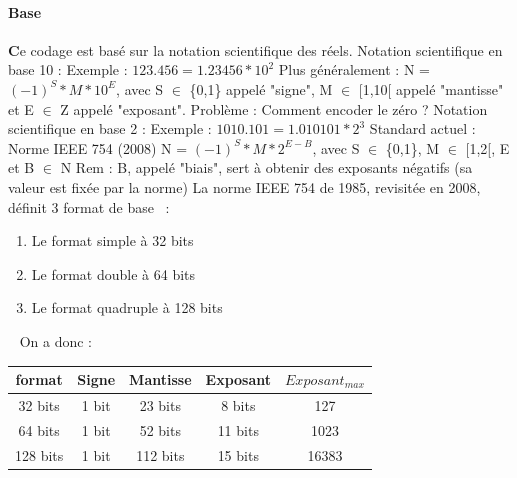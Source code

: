 \documentclass{article}
\begin{document}
\paragraph{Base}\textbf{C}e codage est bas\'e sur la notation scientifique des r\'eels.
Notation scientifique en base 10 :
Exemple : $123.456 = 1.23456 * 10^2$ 
\newline Plus g\'en\'eralement : N = $(-1)^S * M * 10^E$,  avec S $ \in $ \{0,1\} appel\'e "signe",  M $\in $ [1,10[ appel\'e "mantisse" et E $\in $ Z appel\'e "exposant".
\newline Probl\`eme : Comment encoder le z\'ero ? 
\newline Notation scientifique en base 2 :
Exemple : $1010.101 = 1.010101 * 2^3$ 
\newline Standard actuel : Norme IEEE 754 (2008) 
\newline N = $(-1)^S * M * 2^{E - B}$, avec S $\in $ \{0,1\},  M $\in $ [1,2[,  E et B $\in $ N
\newline Rem : B, appel\'e "biais", sert \`a obtenir des exposants n\'egatifs (sa valeur est fix\'ee par la norme)
\newline La norme IEEE 754 de 1985, revisit\'ee en 2008, d\'efinit 3 format de base~\cite{Norme_IEEE754} :
\begin{enumerate}
\item Le format simple \`a 32 bits
\item Le format double \`a 64 bits
\item Le format quadruple \`a 128 bits
\end{enumerate}
~\newline
On a donc :\newline \newline
\begin{tabular}{|c|ccc|c|}
\hline
format & Signe & Mantisse & Exposant & $Exposant_{max}$ \\
\hline
32 bits & 1 bit & 23 bits & 8 bits & 127\\
\hline
64 bits & 1 bit & 52 bits & 11 bits & 1023\\
\hline
128 bits & 1 bit & 112 bits & 15 bits & 16383\\
\hline 
\end{tabular}

\newpage
\end{document}
